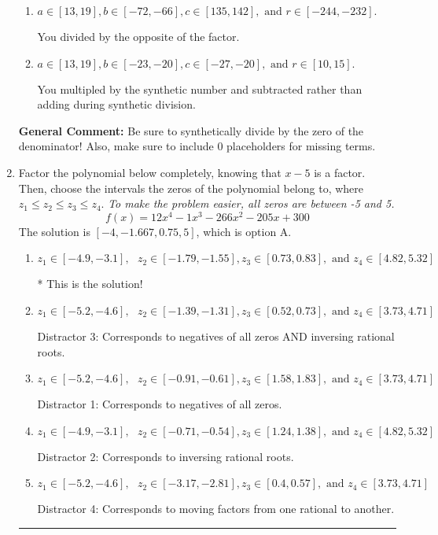 \documentclass{extbook}[14pt]
\newcommand{\litem}[1]{\item #1

\rule{\textwidth}{0.4pt}}
\begin{document}
\begin{enumerate}
{\begin{enumerate}[label=\Alph*.]
* This is the solution!
\item \( a \in [13, 19], b \in [-72, -66], c \in [135, 142], \text{ and } r \in [-244, -232]. \)

 You divided by the opposite of the factor.
\item \( a \in [13, 19], b \in [-23, -20], c \in [-27, -20], \text{ and } r \in [10, 15]. \)

 You multipled by the synthetic number and subtracted rather than adding during synthetic division.
\end{enumerate}

\textbf{General Comment:} Be sure to synthetically divide by the zero of the denominator! Also, make sure to include 0 placeholders for missing terms.
}
\litem{
Factor the polynomial below completely, knowing that $x -5$ is a factor. Then, choose the intervals the zeros of the polynomial belong to, where $z_1 \leq z_2 \leq z_3 \leq z_4$. \textit{To make the problem easier, all zeros are between -5 and 5.}
\[ f(x) = 12x^{4} -1 x^{3} -266 x^{2} -205 x + 300 \]The solution is \( [-4, -1.667, 0.75, 5] \), which is option A.\begin{enumerate}[label=\Alph*.]
\item \( z_1 \in [-4.9, -3.1], \text{   }  z_2 \in [-1.79, -1.55], z_3 \in [0.73, 0.83], \text{   and   } z_4 \in [4.82, 5.32] \)

* This is the solution!
\item \( z_1 \in [-5.2, -4.6], \text{   }  z_2 \in [-1.39, -1.31], z_3 \in [0.52, 0.73], \text{   and   } z_4 \in [3.73, 4.71] \)

 Distractor 3: Corresponds to negatives of all zeros AND inversing rational roots.
\item \( z_1 \in [-5.2, -4.6], \text{   }  z_2 \in [-0.91, -0.61], z_3 \in [1.58, 1.83], \text{   and   } z_4 \in [3.73, 4.71] \)

 Distractor 1: Corresponds to negatives of all zeros.
\item \( z_1 \in [-4.9, -3.1], \text{   }  z_2 \in [-0.71, -0.54], z_3 \in [1.24, 1.38], \text{   and   } z_4 \in [4.82, 5.32] \)

 Distractor 2: Corresponds to inversing rational roots.
\item \( z_1 \in [-5.2, -4.6], \text{   }  z_2 \in [-3.17, -2.81], z_3 \in [0.4, 0.57], \text{   and   } z_4 \in [3.73, 4.71] \)

 Distractor 4: Corresponds to moving factors from one rational to another.
\end{enumerate}

}
\end{enumerate}
\end{document}
